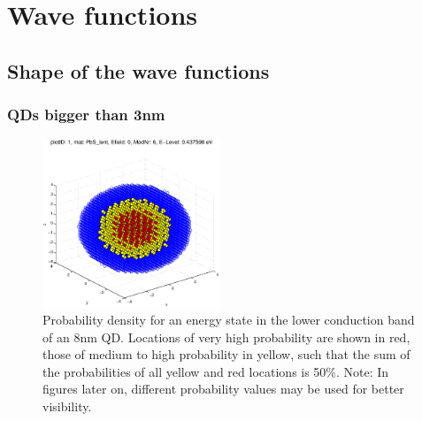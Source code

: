 \section{Wave functions}

\subsection{Shape of the wave functions}

\subsubsection{QDs bigger than 3nm} 

\begin{figure}
	\centering
	\includegraphics[width=200px]{Fig/Plots/r4CBMod6}
	\caption{Probability density for an energy state in the lower conduction band of an 8nm QD. Locations of very high probability are shown in red, those of medium to high probability in yellow, such that the sum of the probabilities of all yellow and red locations is 50\%. Note: In figures later on, different probability values may be used for better visibility.}
	\label{fig:sphericalWaveFn}
\end{figure}
%

